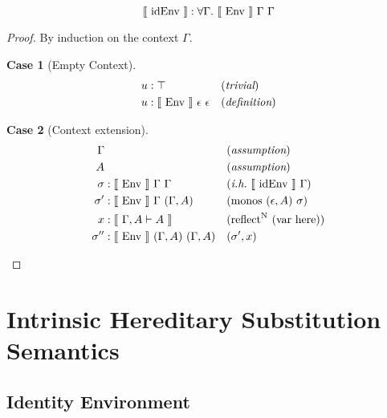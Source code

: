 \documentclass{llncs}
\newtheorem{lcase}{Case}
\def\cross{\times}
\def\emp{\epsilon}
\def\here{\con{here}}
\def\var{\con{var}}
\def\reflectn{\fun{reflect}^\con{N}}
\def\reflect{\reflectn}
\def\monos{\fun{monos}}
\def\midenv{\el{\fun{idEnv}}}
\def\bydef{(\textit{definition})}
\def\byass{(\textit{assumption})}
\def\bytri{(\textit{trivial})}
\newcommand{\ih}[1]{(\textit{i.h.}~ #1)}
\newcommand{\by}[1]{(#1)}
\newcommand{\turn}[1]{\vdash^\con{#1}}
\newcommand{\all}[1]{\forall#1.~}
\newcommand{\el}[1]{\llbracket ~ #1 ~ \rrbracket}
\newcommand{\con}[1]{\textmd{#1}}
\newcommand{\fun}[1]{\textmd{#1}}
\newcommand{\dtypm}[1]{\el{\Delta \vdash #1}}
\newcommand{\gatypm}[1]{\el{\Gamma, A \vdash #1}}
\newcommand{\typv}[1]{\Gamma \turn{V} #1}
\newcommand{\dtypv}[1]{\Delta \turn{V} #1}
\def\env{\fun{Env}~\Gamma~\Delta}
\newcommand{\gmenv}[1]{\el{\fun{Env}}~\Gamma~#1}
\newcommand{\cmenv}[2]{\el{\fun{Env}}~#1~#2}
\begin{document}
\begin{lemma}
\label{lem:mod:midenv}
$$
\midenv : \all{\Gamma} \gmenv{\Gamma}
$$

\begin{proof}
By induction on the context $\Gamma$.

\begin{lcase}[Empty Context]
\begin{align*}
u &: \top && \bytri\\
u &: \cmenv{\emp}{\emp} && \bydef
\end{align*}
\end{lcase}

\begin{lcase}[Context extension]
\begin{align*}
\Gamma& && \byass\\
A& && \byass\\
\sigma  &: \cmenv{\Gamma}{\Gamma} && \ih{\midenv~\Gamma}\\
\sigma' &: \cmenv{\Gamma}{(\Gamma, A)} && \by{\monos~(\emp, A)~\sigma}\\
x    &: \gatypm{A} && \by{\reflect~(\var~\here)}\\
\sigma'' &: \cmenv{(\Gamma, A)}{(\Gamma, A)} && \by{\sigma', x}
\end{align*}
\end{lcase}

\end{proof}

\end{lemma}

\section{Intrinsic Hereditary Substitution Semantics}
\label{sec:vmod}


\subsection{Identity Environment}

\end{document}
